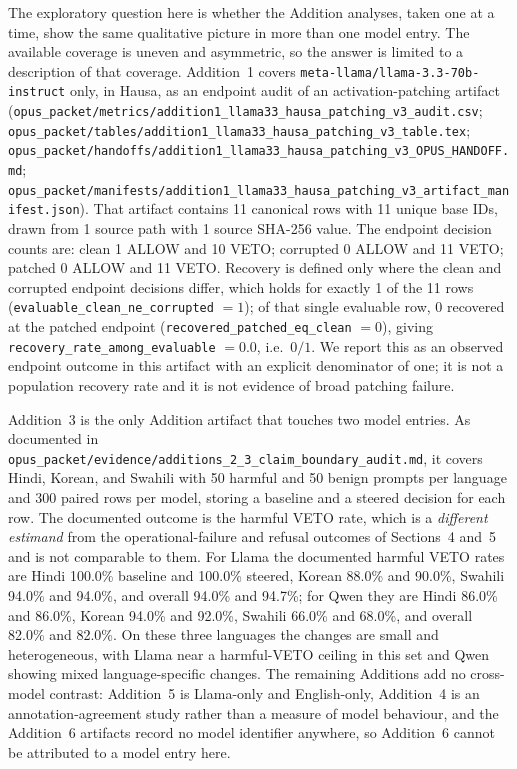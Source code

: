The exploratory question here is whether the Addition analyses, taken one at a
time, show the same qualitative picture in more than one model entry. The
available coverage is uneven and asymmetric, so the answer is limited to a
description of that coverage. Addition~1 covers
\texttt{meta-llama/llama-3.3-70b-instruct} only, in Hausa, as an endpoint audit
of an activation-patching artifact
(\texttt{opus\_packet/metrics/addition1\_llama33\_hausa\_patching\_v3\_audit.csv};
\texttt{opus\_packet/tables/addition1\_llama33\_hausa\_patching\_v3\_table.tex};
\texttt{opus\_packet/handoffs/addition1\_llama33\_hausa\_patching\_v3\_OPUS\_HANDOFF.md};
\texttt{opus\_packet/manifests/addition1\_llama33\_hausa\_patching\_v3\_artifact\_manifest.json}).
That artifact contains 11 canonical rows with 11 unique base IDs, drawn from 1
source path with 1 source SHA-256 value. The endpoint decision counts are: clean
1 ALLOW and 10 VETO; corrupted 0 ALLOW and 11 VETO; patched 0 ALLOW and 11
VETO. Recovery is defined only where the clean and corrupted endpoint decisions
differ, which holds for exactly 1 of the 11 rows
(\texttt{evaluable\_clean\_ne\_corrupted} $=1$); of that single evaluable row, 0
recovered at the patched endpoint (\texttt{recovered\_patched\_eq\_clean} $=0$),
giving \texttt{recovery\_rate\_among\_evaluable} $=0.0$, i.e.\ $0/1$. We report
this as an observed endpoint outcome in this artifact with an explicit
denominator of one; it is not a population recovery rate and it is not evidence
of broad patching failure.

Addition~3 is the only Addition artifact that touches two model entries. As
documented in
\texttt{opus\_packet/evidence/additions\_2\_3\_claim\_boundary\_audit.md}, it
covers Hindi, Korean, and Swahili with 50 harmful and 50 benign prompts per
language and 300 paired rows per model, storing a baseline and a steered
decision for each row. The documented outcome is the harmful VETO rate, which is
a \emph{different estimand} from the operational-failure and refusal outcomes of
Sections~4 and~5 and is not comparable to them. For Llama the documented harmful
VETO rates are Hindi 100.0\% baseline and 100.0\% steered, Korean 88.0\% and
90.0\%, Swahili 94.0\% and 94.0\%, and overall 94.0\% and 94.7\%; for Qwen they
are Hindi 86.0\% and 86.0\%, Korean 94.0\% and 92.0\%, Swahili 66.0\% and
68.0\%, and overall 82.0\% and 82.0\%. On these three languages the changes are
small and heterogeneous, with Llama near a harmful-VETO ceiling in this set and
Qwen showing mixed language-specific changes. The remaining Additions add no
cross-model contrast: Addition~5 is Llama-only and English-only, Addition~4 is
an annotation-agreement study rather than a measure of model behaviour, and the
Addition~6 artifacts record no model identifier anywhere, so Addition~6 cannot
be attributed to a model entry here.

